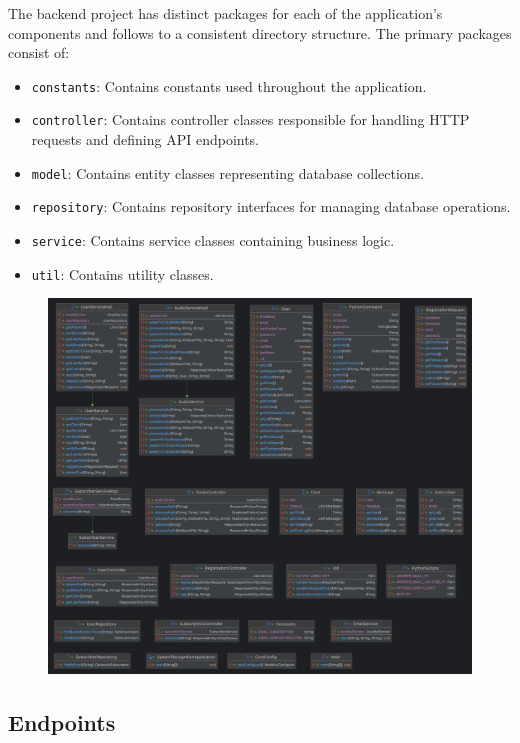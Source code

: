 \documentclass[conference]{IEEEtran}
\begin{document}
The backend project has distinct packages for each of the application's components and follows to a consistent directory structure. The primary packages consist of:

\begin{itemize}
    \item \texttt{constants}: Contains constants used throughout the application.
    \item \texttt{controller}: Contains controller classes responsible for handling HTTP requests and defining API endpoints.
    \item \texttt{model}: Contains entity classes representing database collections.
    \item \texttt{repository}: Contains repository interfaces for managing database operations.
    \item \texttt{service}: Contains service classes containing business logic.
    \item \texttt{util}: Contains utility classes.
\end{itemize}


\begin{figure}[ht]
\centering
\includegraphics[width=\textwidth]{UML_Diagram.png}
    \label{fig:database_structure}
\end{figure}


\subsection{Endpoints}
\end{document}
